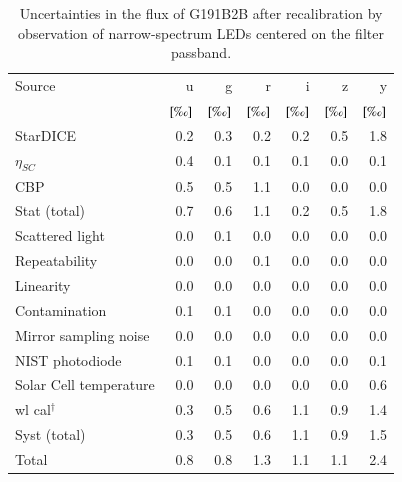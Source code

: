 \begin{table}
  \centering
  \caption{Uncertainties in the flux of G191B2B after recalibration by observation of narrow-spectrum LEDs centered on the filter passband.}
  \label{tab:led}
  \begin{tabular}{lrrrrrr}
    \toprule
    Source & u & g & r & i & z & y \\
           & $[\text{\textperthousand}]$ & $[\text{\textperthousand}]$ & $[\text{\textperthousand}]$ & $[\text{\textperthousand}]$ & $[\text{\textperthousand}]$ & $[\text{\textperthousand}]$\\
    \midrule
    StarDICE & 0.2 & 0.3 & 0.2 & 0.2 & 0.5 & 1.8 \\
    $\eta_{SC}$ & 0.4 & 0.1 & 0.1 & 0.1 & 0.0 & 0.1 \\
    CBP & 0.5 & 0.5 & 1.1 & 0.0 & 0.0 & 0.0 \\
    \midrule
    Stat (total) & 0.7 & 0.6 & 1.1 & 0.2 & 0.5 & 1.8 \\
    \midrule
    Scattered light & 0.0 & 0.1 & 0.0 & 0.0 & 0.0 & 0.0 \\
    Repeatability & 0.0 & 0.0 & 0.1 & 0.0 & 0.0 & 0.0 \\
    Linearity & 0.0 & 0.0 & 0.0 & 0.0 & 0.0 & 0.0 \\
    Contamination & 0.1 & 0.1 & 0.0 & 0.0 & 0.0 & 0.0 \\
    Mirror sampling noise & 0.0 & 0.0 & 0.0 & 0.0 & 0.0 & 0.0 \\
    NIST photodiode & 0.1 & 0.1 & 0.0 & 0.0 & 0.0 & 0.1 \\
    Solar Cell temperature & 0.0 & 0.0 & 0.0 & 0.0 & 0.0 & 0.6 \\
    wl cal$^\dag$ & 0.3 & 0.5 & 0.6 & 1.1 & 0.9 & 1.4 \\
    \midrule
    Syst (total) & 0.3 & 0.5 & 0.6 & 1.1 & 0.9 & 1.5 \\
    \midrule
    Total & 0.8 & 0.8 & 1.3 & 1.1 & 1.1 & 2.4 \\
    \bottomrule
  \end{tabular}
  
\end{table}



